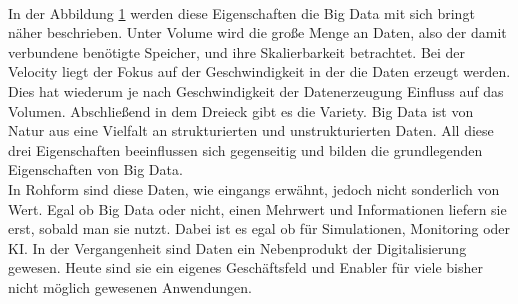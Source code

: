 \begin{onehalfspace}
\begin{figure}[h]
            \label{fig:3VRule}
        \end{figure}
        \\
        In der Abbildung \ref*{fig:3VRule} werden diese Eigenschaften die Big Data mit sich bringt näher beschrieben. Unter \glqq{}Volume\grqq{} wird die große Menge an Daten, also der damit verbundene benötigte Speicher, und ihre Skalierbarkeit betrachtet. Bei der \glqq{}Velocity\grqq{} liegt der Fokus auf der Geschwindigkeit in der die Daten erzeugt werden. Dies hat wiederum je nach Geschwindigkeit der Datenerzeugung Einfluss auf das Volumen. Abschließend in dem Dreieck gibt es die \glqq{}Variety\grqq{}. Big Data ist von Natur aus eine Vielfalt an strukturierten und unstrukturierten Daten. All diese drei Eigenschaften beeinflussen sich gegenseitig und bilden die grundlegenden Eigenschaften von Big Data.
        \\
        In Rohform sind diese Daten, wie eingangs erwähnt, jedoch nicht sonderlich von Wert. Egal ob Big Data oder nicht, einen Mehrwert und Informationen liefern sie erst, sobald man sie nutzt. Dabei ist es egal ob für Simulationen, Monitoring oder \ac{KI}. In der Vergangenheit sind Daten ein Nebenprodukt der Digitalisierung gewesen. Heute sind sie ein eigenes Geschäftsfeld und \glqq{}Enabler\grqq{} für viele bisher nicht möglich gewesenen Anwendungen.\cite{Otto2019}\cite{Gröger2021}


\end{onehalfspace}
